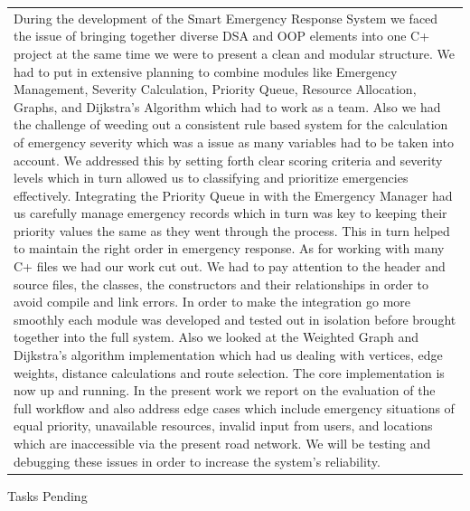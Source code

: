 \documentclass[12pt,a4paper]{article}
\newcommand{\sectiontitle}[1]{%
    {\color{GEUBlue}
    \fontsize{18}{22}\selectfont #1}
}
\newcommand{\instruction}[1]{%
    {\color{InstructionGrey}
    \fontsize{10.5}{13}\selectfont #1}
}
\newcommand{\answerbox}[2]{%
    \begin{tabularx}{\textwidth}{
        |>{\raggedright\arraybackslash}X|}
        \hline
        \parbox[t][#1][t]{\dimexpr\linewidth-12pt\relax}{
            \vspace{5pt}
            \fontsize{11}{13}\selectfont #2
        }\\
        \hline
    \end{tabularx}
}
\begin{document}
\answerbox{9.00cm}{During the development of the Smart Emergency Response System we faced the issue of bringing together diverse DSA and OOP elements into one C+ project at the same time we were to present a clean and modular structure. We had to put in extensive planning to combine modules like Emergency Management, Severity Calculation, Priority Queue, Resource Allocation, Graphs, and Dijkstra’s Algorithm which had to work as a team. Also we had the challenge of weeding out a consistent rule based system for the calculation of emergency severity which was a issue as many variables had to be taken into account. We addressed this by setting forth clear scoring criteria and severity levels which in turn allowed us to classifying and prioritize emergencies effectively. Integrating the Priority Queue in with the Emergency Manager had us carefully manage emergency records which in turn was key to keeping their priority values the same as they went through the process. This in turn helped to maintain the right order in emergency response. As for working with many C+ files we had our work cut out. We had to pay attention to the header and source files, the classes, the constructors and their relationships in order to avoid compile and link errors. In order to make the integration go more smoothly each module was developed and tested out in isolation before brought together into the full system. Also we looked at the Weighted Graph and Dijkstra’s algorithm implementation which had us dealing with vertices, edge weights, distance calculations and route selection. The core implementation is now up and running. In the present work we report on the evaluation of the full workflow and also address edge cases which include emergency situations of equal priority, unavailable resources, invalid input from users, and locations which are inaccessible via the present road network. We will be testing and debugging these issues in order to increase the system’s reliability.
}
\newpage

\vspace{0.45cm}

\sectiontitle{Tasks Pending}

\vspace{0.05cm}

\instruction{}

\vspace{0.32cm}
\end{document}
